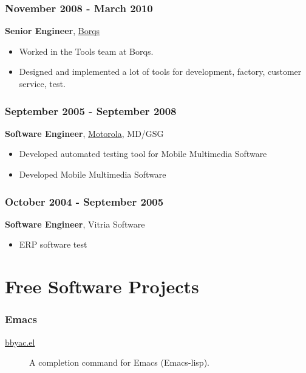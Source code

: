 \documentclass[11pt,dvipdfmx,CJKbookmarks]{article}
\begin{document}
\begin{CJK*}{UTF8}{simsun}
\subsubsection{November 2008 - March 2010}
\label{sec:org46ff093}

\textbf{Senior Engineer}, \href{http://www.borqs.com}{Borqs}

\begin{itemize}
\item Worked in the Tools team at Borqs.

\item Designed and implemented a lot of tools for development,
factory, customer service, test.
\end{itemize}

\subsubsection{September 2005 - September 2008}
\label{sec:org54f306f}

\textbf{Software Engineer}, \href{http://motorola.com}{Motorola},  MD/GSG

\begin{itemize}
\item Developed automated testing tool for Mobile Multimedia Software

\item Developed Mobile Multimedia Software
\end{itemize}

\subsubsection{October 2004 - September 2005}
\label{sec:org5388be5}
\textbf{Software Engineer}, Vitria Software

\begin{itemize}
\item ERP software test
\end{itemize}

\section{Free Software Projects}
\label{sec:org93c1151}

\subsubsection{Emacs}
\label{sec:org005c7a0}
\begin{description}
\item[{\href{http://github.com/baohaojun/bbyac}{bbyac.el}}] A completion command for Emacs (Emacs-lisp).


\end{description}
\end{CJK*}
\end{document}

